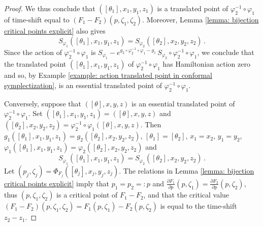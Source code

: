 \documentclass{amsart}
\theoremstyle{remark}
\begin{document}
\begin{proof}
We thus conclude that $([\theta_1], x_1, y_1, z_1)$
is a translated point of $\varphi_2^{-1} \circ \varphi_1$
of time-shift equal to $(F_1 - F_2) (p, \zeta_1, \zeta_2)$.
Moreover,
Lemma \ref{lemma: bijection critical points explicit}
also gives
\[
S_{\varphi_1} ([\theta_1], x_1, y_1, z_1) = S_{\varphi_2} ([\theta_2], x_2, y_2, z_2) \,.
\]
Since the action of $\varphi_2^{-1} \circ \varphi_1$
is $S_{\varphi_1}
- e^{g_2 \circ \varphi_2^{-1} \circ \varphi_1 - g_1} \,
S_{\varphi_2} \circ \varphi_2^{-1} \circ \varphi_1$,
we conclude that the translated point $([\theta_1], x_1, y_1, z_1)$
of $\varphi_2^{-1} \circ \varphi_1$
has Hamiltonian action zero
and so, by Example \ref{example: action translated point in conformal symplectization},
is an essential translated point of $\varphi_2^{-1} \circ \varphi_1$.

Conversely,
suppose that $([\theta], x, y, z)$
is an essential translated point of $\varphi_2^{-1} \circ \varphi_1$.
Set $([\theta_1], x_1, y_1, z_1) = ([\theta], x, y, z)$
and $([\theta_2], x_2, y_2, z_2) = \varphi_2^{-1} \circ \varphi_1 ([\theta], x, y, z)$.
Then $g_1 ([\theta_1], x_1, y_1, z_1) = g_2 ([\theta_2], x_2, y_2, z_2)$,
$[\theta_1] = [\theta_2]$,
$x_1 = x_2$, $y_1 = y_2$,
$\varphi_1 ([\theta_1], x_1, y_1, z_1) = \varphi_2 ([\theta_2], x_2, y_2, z_2)$
and
$$
S_{\varphi_1} ([\theta_1], x_1, y_1, z_1) = S_{\varphi_2} ([\theta_2], x_2, y_2, z_2) \,.
$$
Let $(p_j, \zeta_j) = \Phi_{F_j} ([\theta_j], x_j, y_j, z_j)$.
The relations in Lemma \ref{lemma: bijection critical points explicit}
imply that $p_1 = p_2 =: p$
and $\frac{\partial F_1}{\partial p} (p, \zeta_1)
= \frac{\partial F_2}{\partial p} (p, \zeta_2)$,
thus $(p, \zeta_1, \zeta_2)$
is a critical point of $F_1 - F_2$,
and that the critical value
$(F_1 - F_2) (p, \zeta_1, \zeta_2) = F_1 (p, \zeta_1) - F_2 (p, \zeta_2)$
is equal to the time-shift $z_2 - z_1$.
\end{proof}
\end{document}
